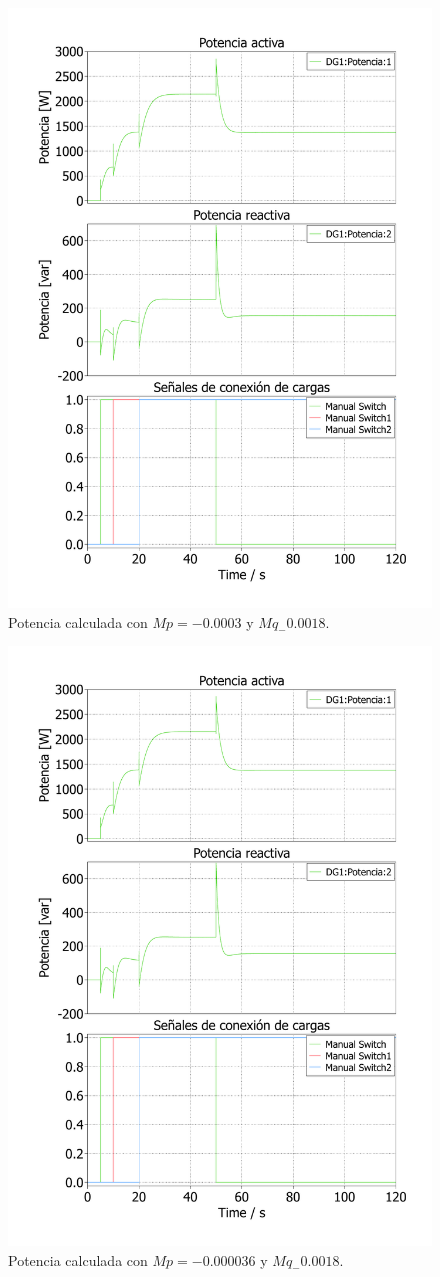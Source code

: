\begin{figure}
   \centering
   \includegraphics[width=0.5\linewidth]{Tarea 1/report/imagenes/p3a/droop_2.pdf}
   \caption{Potencia calculada con $Mp = -0.0003$ y $Mq_-0.0018$.}
   \label{droop_2}
\end{figure}

\begin{figure}
   \centering
   \includegraphics[width=0.5\linewidth]{Tarea 1/report/imagenes/p3a/droop_3.pdf}
   \caption{Potencia calculada con $Mp = -0.000036$ y $Mq_-0.0018$.}
   \label{droop_3}
\end{figure}